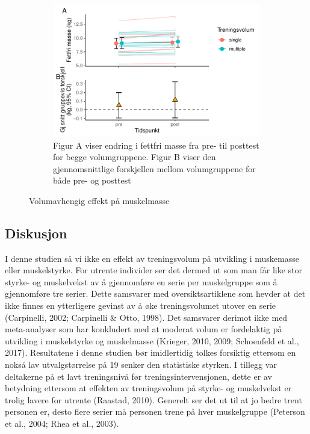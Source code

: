 \documentclass[
  letterpaper,
  DIV=11,
  numbers=noendperiod]{scrartcl}
\begin{document}
\begin{figure}

{\centering 

\begin{figure}

{\centering \includegraphics{assignment-5_files/figure-pdf/fig-lbm-1.pdf}

}

\caption{Figur A viser endring i fettfri masse fra pre- til posttest for
begge volumgruppene. Figur B viser den gjennomsnittlige forskjellen
mellom volumgruppene for både pre- og posttest}

\end{figure}

}

\caption{\label{fig-lbm}Volumavhengig effekt på muskelmasse}

\end{figure}

\hypertarget{diskusjon}{%
\subsection{Diskusjon}\label{diskusjon}}

I denne studien så vi ikke en effekt av treningsvolum på utvikling i
muskemasse eller muskelstyrke. For utrente individer ser det dermed ut
som man får like stor styrke- og muskelvekst av å gjennomføre en serie
per muskelgruppe som å gjennomføre tre serier. Dette samsvarer med
oversiktsartiklene som hevder at det ikke finnes en ytterligere gevinst
av å øke treningsvolumet utover en serie (Carpinelli, 2002; Carpinelli
\& Otto, 1998). Det samsvarer derimot ikke med meta-analyser som har
konkludert med at moderat volum er fordelaktig på utvikling i
muskelstyrke og muskelmasse (Krieger, 2010, 2009; Schoenfeld et al.,
2017). Resultatene i denne studien bør imidlertidig tolkes forsiktig
ettersom en nokså lav utvalgstørrelse på 19 senker den statistiske
styrken. I tillegg var deltakerne på et lavt treningsnivå før
treningsintervensjonen, dette er av betydning ettersom at effekten av
treningsvolum på styrke- og muskelvekst er trolig lavere for utrente
(Raastad, 2010). Generelt ser det ut til at jo bedre trent personen er,
desto flere serier må personen trene på hver muskelgruppe (Peterson et
al., 2004; Rhea et al., 2003).
\end{document}
